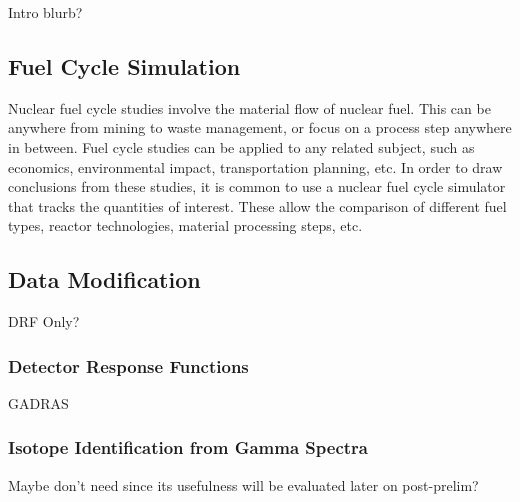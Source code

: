 Intro blurb?

\subsection{Fuel Cycle Simulation}

Nuclear fuel cycle studies involve the material flow of nuclear fuel. This can
be anywhere from mining to waste management, or focus on a process step
anywhere in between. Fuel cycle studies can be applied to any related subject,
such as economics, environmental impact, transportation planning, etc. In order
to draw conclusions from these studies, it is common to use a nuclear fuel
cycle simulator that tracks the quantities of interest. These allow the
comparison of different fuel types, reactor technologies, material processing
steps, etc. 

\subsection{Data Modification}

DRF Only?

\subsubsection{Detector Response Functions}

GADRAS

\subsubsection{Isotope Identification from Gamma Spectra}

Maybe don't need since its usefulness will be evaluated later on post-prelim?


